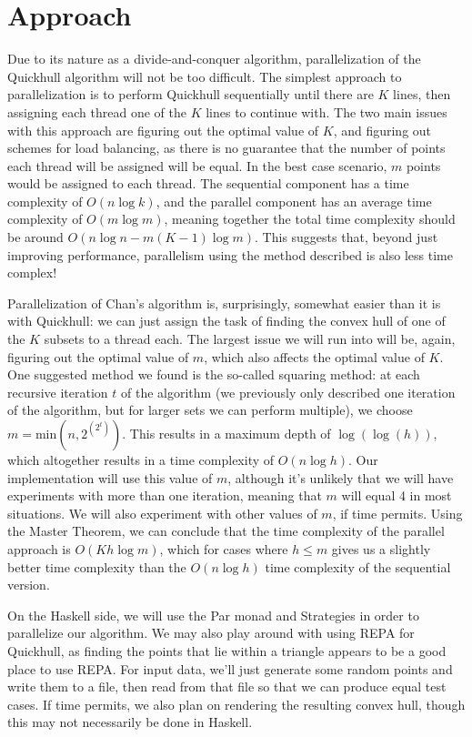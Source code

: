 \documentclass[12pt]{article}
\begin{document}
\section{Approach}


Due to its nature as a divide-and-conquer algorithm, parallelization of the Quickhull algorithm will not be too difficult. The simplest approach to parallelization is to perform Quickhull sequentially until there are $K$ lines, then assigning each thread one of the $K$ lines to continue with. The two main issues with this approach are figuring out the optimal value of $K$, and figuring out schemes for load balancing, as there is no guarantee that the number of points each thread will be assigned will be equal. In the best case scenario, $m$ points would be assigned to each thread. The sequential component has a time complexity of $O(n\log k)$, and the parallel component has an average time complexity of $O(m \log m)$, meaning together the total time complexity should be around $O(n \log n - m(K - 1)\log m)$. This suggests that, beyond just improving performance, parallelism using the method described is also less time complex!

Parallelization of Chan’s algorithm is, surprisingly, somewhat easier than it is with Quickhull: we can just assign the task of finding the convex hull of one of the $K$ subsets to a thread each. The largest issue we will run into will be, again, figuring out the optimal value of $m$, which also affects the optimal value of $K$. One suggested method we found is the so-called squaring method: at each recursive iteration $t$ of the algorithm (we previously only described one iteration of the algorithm, but for larger sets we can perform multiple), we choose $m = \text{min}(n, 2^(2^t))$. This results in a maximum depth of $\log(\log(h))$, which altogether results in a time complexity of $O(n\log h)$. Our implementation will use this value of $m$, although it’s unlikely that we will have experiments with more than one iteration, meaning that $m$ will equal 4 in most situations. We will also experiment with other values of $m$, if time permits. Using the Master Theorem, we can conclude that the time complexity of the parallel approach is $O(Kh\log m)$, which for cases where $h \leq m$ gives us a slightly better time complexity than the $O(n\log h)$ time complexity of the sequential version.

	On the Haskell side, we will use the Par monad and Strategies in order to parallelize our algorithm. We may also play around with using REPA for Quickhull, as finding the points that lie within a triangle appears to be a good place to use REPA. For input data, we’ll just generate some random points and write them to a file, then read from that file so that we can produce equal test cases. If time permits, we also plan on rendering the resulting convex hull, though this may not necessarily be done in Haskell.

\nocite{*}
\printbibliography
\end{document}
